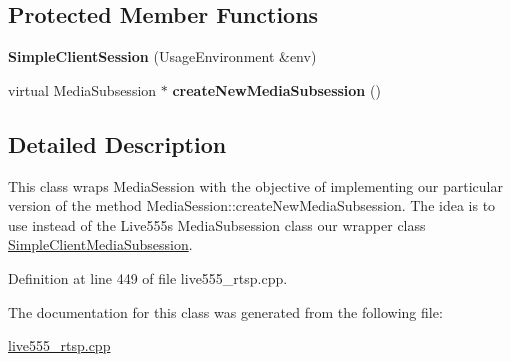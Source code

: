 \subsection*{Protected Member Functions}
\begin{DoxyCompactItemize}
\item 
{\bfseries Simple\+Client\+Session} (Usage\+Environment \&env)\hypertarget{classSimpleClientSession_a1339b30b5f4ad7cc9d6f78ff734bb43b}{}\label{classSimpleClientSession_a1339b30b5f4ad7cc9d6f78ff734bb43b}

\item 
virtual Media\+Subsession $\ast$ {\bfseries create\+New\+Media\+Subsession} ()\hypertarget{classSimpleClientSession_a68a0a9b087d4907b8d16513f6546b420}{}\label{classSimpleClientSession_a68a0a9b087d4907b8d16513f6546b420}

\end{DoxyCompactItemize}


\subsection{Detailed Description}
This class wraps Media\+Session with the objective of implementing our particular version of the method Media\+Session\+::create\+New\+Media\+Subsession. The idea is to use instead of the Live555\textquotesingle{}s Media\+Subsession class our wrapper class \hyperlink{classSimpleClientMediaSubsession}{Simple\+Client\+Media\+Subsession}. 

Definition at line 449 of file live555\+\_\+rtsp.\+cpp.



The documentation for this class was generated from the following file\+:\begin{DoxyCompactItemize}
\item 
\hyperlink{live555__rtsp_8cpp}{live555\+\_\+rtsp.\+cpp}\end{DoxyCompactItemize}
